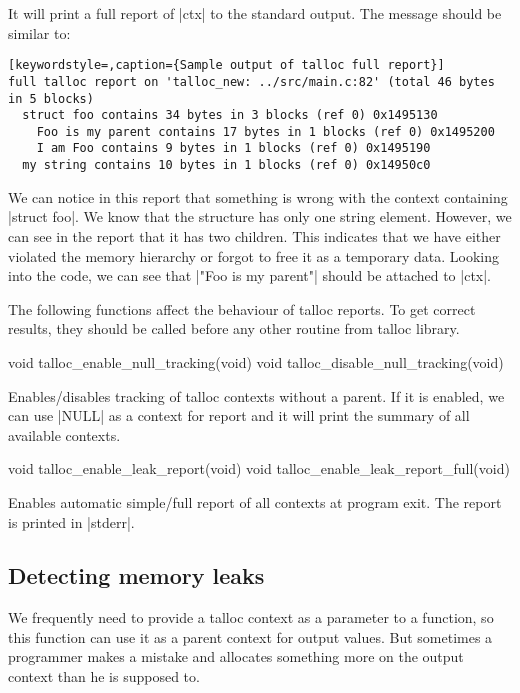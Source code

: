 \noindent
It will print a full report of |ctx| to the standard output. The message should
be similar to:

\begin{lstlisting}[keywordstyle=,caption={Sample output of talloc full report}]
full talloc report on 'talloc_new: ../src/main.c:82' (total 46 bytes in 5 blocks)
  struct foo contains 34 bytes in 3 blocks (ref 0) 0x1495130
    Foo is my parent contains 17 bytes in 1 blocks (ref 0) 0x1495200
    I am Foo contains 9 bytes in 1 blocks (ref 0) 0x1495190
  my string contains 10 bytes in 1 blocks (ref 0) 0x14950c0
\end{lstlisting}

\noindent
We can notice in this report that something is wrong with the context containing
|struct foo|. We know that the structure has only one string element. However,
we can see in the report that it has two children. This indicates that we have
either violated the memory hierarchy or forgot to free it as a temporary data.
Looking into the code, we can see that |"Foo is my parent"| should be attached
to |ctx|.

The following functions affect the behaviour of talloc reports. To get correct
results, they should be called before any other routine from talloc library.

\begin{funcproto}
void talloc_enable_null_tracking(void)
void talloc_disable_null_tracking(void)
\end{funcproto}
\begin{funcdesc}
Enables/disables tracking of talloc contexts without a parent. If it is enabled,
we can use |NULL| as a context for report and it will print the summary of all
available contexts.
\end{funcdesc}

\begin{funcproto}
void talloc_enable_leak_report(void)
void talloc_enable_leak_report_full(void)
\end{funcproto}
\begin{funcdesc}
  Enables automatic simple/full report of all contexts at program exit. The
  report is printed in |stderr|.
\end{funcdesc}

\subsection{Detecting memory leaks}

We frequently need to provide a talloc context as a parameter to a function, so
this function can use it as a parent context for output values. But sometimes a
programmer makes a mistake and allocates something more on the output context
than he is supposed to.

